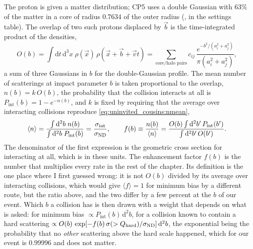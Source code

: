 The proton is given a matter distribution; CP5 uses a double Gaussian with
$63\%$ of the matter in a core of radius $0.7634$ of the outer radius
(,  in the \CMSSW settings table). The
overlap of two such protons displaced by $\vec b$ is the time-integrated
product of the densities,
\begin{equation}
  O(b)=\int\mathrm{d}t\,\mathrm{d}^3x\;\rho(\vec x)\,\rho(\vec x+\vec b+\vec v t)
  =\sum_{\text{core/halo pairs}}c_{ij}\,\frac{e^{-b^2/(a_i^2+a_j^2)}}{\pi(a_i^2+a_j^2)},
  \label{eq:uninvited_cousins:overlap}
\end{equation}
a sum of three Gaussians in $b$ for the double-Gaussian profile. The mean
number of scatterings at impact parameter $b$ is taken proportional to the
overlap, $n(b)=k\,O(b)$, the probability that the collision interacts at all
is $P_{\mathrm{int}}(b)=1-e^{-n(b)}$, and $k$ is fixed by requiring that the
average over interacting collisions reproduce \cref{eq:uninvited_cousins:nmean},
\begin{equation}
  \langle n\rangle=\frac{\int\mathrm{d}^2b\;n(b)}{\int\mathrm{d}^2b\;P_{\mathrm{int}}(b)}
  =\frac{\sigma_{\mathrm{int}}}{\sigma_{\mathrm{ND}}},
  \qquad
  f(b)\equiv\frac{n(b)}{\langle n\rangle}
  =\frac{O(b)\int\mathrm{d}^2b'\,P_{\mathrm{int}}(b')}{\int\mathrm{d}^2b'\,O(b')}.
  \label{eq:uninvited_cousins:fb}
\end{equation}
The denominator of the first expression is the geometric cross section for
interacting at all, which is \signd in these units. The enhancement factor
$f(b)$ is the number that multiplies every rate in the rest of the chapter.
Its definition is the one place where I first guessed wrong: it is not
$O(b)$ divided by its average over interacting collisions, which would give
$\langle f\rangle=1$ for minimum bias by a different route, but the ratio
above, and the two differ by a few percent at the $b$ of our event. Which
$b$ a collision has is then drawn with a weight that depends on what is
asked: for minimum bias $\propto P_{\mathrm{int}}(b)\,\mathrm{d}^2b$, for a
collision known to contain a hard scattering
$\propto O(b)\,\exp[-f(b)\,\sigma(>Q_{\mathrm{hard}})/\sigma_{\mathrm{ND}}]\,\mathrm{d}^2b$,
the exponential being the probability that no \emph{other} scattering above
the hard scale happened, which for our event is $0.99996$ and does not
matter.

